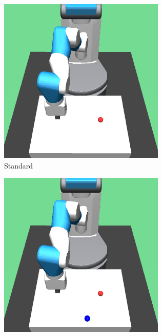 \begin{figure}[h!]
  \centering
  \begin{subfigure}{0.32\textwidth}
    \includegraphics[width=\textwidth]{figures/chapter6/test_observations/standard}
    \caption{Standard}
  \end{subfigure}
  \begin{subfigure}{0.32\textwidth}
    \includegraphics[width=\textwidth]{figures/chapter6/test_observations/colour_b}

\end{subfigure}
\end{figure}
